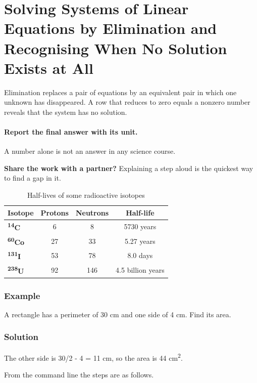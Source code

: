\documentclass[11pt]{article}
\begin{document}
\section{Solving Systems of Linear Equations by Elimination and Recognising When No Solution Exists at All}

Elimination replaces a pair of equations by an equivalent pair in which one unknown has disappeared. A row that reduces to zero equals a nonzero number reveals that the system has no solution.

\paragraph{Report the final answer with its unit.} A number alone is not an answer in any science course.

\textbf{Share the work with a partner?} Explaining a step aloud is the quickest way to find a gap in it.

\begin{table}[H]
\centering
\caption{Half-lives of some radioactive isotopes}
\begin{tabular}{lccc}
\toprule
\textbf{Isotope} & \textbf{Protons} & \textbf{Neutrons} & \textbf{Half-life} \\
\midrule
\textbf{\textsuperscript{14}C} & 6 & 8 & 5730 years \\
\textbf{\textsuperscript{60}Co} & 27 & 33 & 5.27 years \\
\textbf{\textsuperscript{131}I} & 53 & 78 & 8.0 days \\
\textbf{\textsuperscript{238}U} & 92 & 146 & 4.5 billion years \\
\bottomrule
\end{tabular}
\end{table}

\subsubsection*{Example}

A rectangle has a perimeter of 30 cm and one side of 4 cm. Find its area.

\subsubsection*{Solution}

The other side is 30/2 - 4 = 11 cm, so the area is 44 cm\textsuperscript{2}.

From the command line the steps are as follows.
\end{document}
